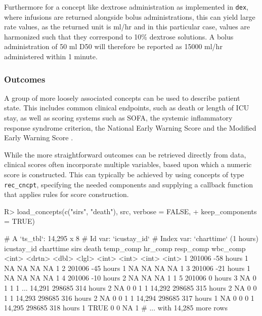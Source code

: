 \documentclass[
  notitle]{jss}
\begin{document}
Furthermore for a concept like dextrose administration as implemented in
\texttt{dex}, where infusions are returned alongside bolus
administrations, this can yield large rate values, as the returned unit
is ml/hr and in this particular case, values are harmonized such that
they correspond to 10\% dextrose solutions. A bolus administration of 50
ml D50 will therefore be reported as 15000 ml/hr administered within 1
minute.

\hypertarget{outcomes}{%
\subsubsection{Outcomes}\label{outcomes}}

A group of more loosely associated concepts can be used to describe
patient state. This includes common clinical endpoints, such as death or
length of ICU stay, as well as scoring systems such as SOFA, the
systemic inflammatory response syndrome \citep[SIRS;][]{bone1992}
criterion, the National Early Warning Score \citep[NEWS;][]{jones2012}
and the Modified Early Warning Score \citep[MEWS;][]{subbe2001}.

While the more straightforward outcomes can be retrieved directly from
data, clinical scores often incorporate multiple variables, based upon
which a numeric score is constructed. This can typically be achieved by
using concepts of type \texttt{rec\_cncpt}, specifying the needed
components and supplying a callback function that applies rules for
score construction.

\begin{CodeChunk}
\begin{CodeInput}
R> load_concepts(c("sirs", "death"), src, verbose = FALSE,
+               keep_components = TRUE)
\end{CodeInput}
\begin{CodeOutput}
# A `ts_tbl`: 14,295 x 8
# Id var:     `icustay_id`
# Index var:  `charttime` (1 hours)
       icustay_id charttime  sirs death temp_comp hr_comp resp_comp wbc_comp
            <int> <drtn>    <dbl> <lgl>     <int>   <int>     <int>    <int>
     1     201006 -58 hours     1 NA           NA      NA        NA        1
     2     201006 -45 hours     1 NA           NA      NA        NA        1
     3     201006 -21 hours     1 NA           NA      NA        NA        1
     4     201006 -10 hours     2 NA           NA      NA         1        1
     5     201006   0 hours     3 NA            0       1         1        1
   ...
14,291     298685 314 hours     2 NA            0       0         1        1
14,292     298685 315 hours     2 NA            0       0         1        1
14,293     298685 316 hours     2 NA            0       0         1        1
14,294     298685 317 hours     1 NA            0       0         0        1
14,295     298685 318 hours     1 TRUE          0       0        NA        1
# ... with 14,285 more rows
\end{CodeOutput}
\end{CodeChunk}
\end{document}
